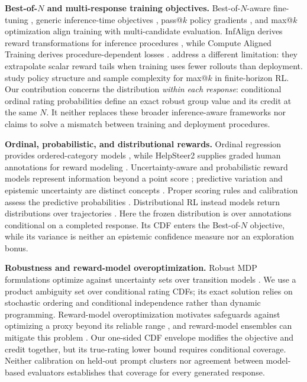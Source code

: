 \documentclass{article}
\theoremstyle{definition}
\theoremstyle{remark}
\begin{document}
\textbf{Best-of-\(N\) and multi-response training objectives.}
Best-of-\(N\)-aware fine-tuning \citep{chow2025inference}, generic
inference-time objectives \citep{tang2025inference}, pass@\(k\) policy
gradients \citep{walder2025pkpo}, and max@\(k\) optimization
\citep{bagirov2025best} align training with multi-candidate evaluation.
InfAlign derives reward transformations for inference procedures
\citep{balashankar2024infalign}, while Compute Aligned Training derives
procedure-dependent losses \citep{ousherovitch2026compute}.
\citet{li2026posttraining} address a different limitation: they extrapolate
scalar reward tails when training uses fewer rollouts than deployment.
\citet{poiani2026maxk} study policy structure and sample complexity for
max@\(k\) in finite-horizon RL. Our contribution concerns the distribution
\emph{within each response}: conditional ordinal rating probabilities define
an exact robust group value and its credit at the same \(N\). It neither
replaces these broader inference-aware frameworks nor claims to solve a
mismatch between training and deployment procedures.

\textbf{Ordinal, probabilistic, and distributional rewards.}
Ordinal regression provides ordered-category models
\citep{mccullagh1980regression}, while HelpSteer2 supplies graded human
annotations for reward modeling \citep{wang2024helpsteer2}. Uncertainty-aware
and probabilistic reward models represent information beyond a point score
\citep{lou2024uncertainty,sun2025purm}; predictive variation and epistemic
uncertainty are distinct concepts \citep{kendall2017uncertainties}.
Proper scoring rules and calibration assess the predictive probabilities
\citep{gneiting2007strictly,guo2017calibration}. Distributional RL instead
models return distributions over trajectories
\citep{bellemare2017distributional,dabney2018distributional}.
Here the frozen distribution is over annotations conditional on a completed
response. Its CDF enters the Best-of-\(N\) objective, while its variance
is neither an epistemic confidence measure nor an exploration bonus.

\textbf{Robustness and reward-model overoptimization.}
Robust MDP formulations optimize against uncertainty sets over transition
models \citep{iyengar2005robust,nilim2005robust}. We use a product ambiguity
set over conditional rating CDFs; its exact solution relies on stochastic
ordering and conditional independence rather than dynamic programming.
Reward-model overoptimization motivates safeguards against optimizing a proxy
beyond its reliable range \citep{gao2023scaling}, and reward-model ensembles
can mitigate this problem \citep{coste2024reward}. Our one-sided CDF envelope
modifies the objective and credit together, but its true-rating lower bound
requires conditional coverage. Neither calibration on held-out prompt
clusters nor agreement between model-based evaluators establishes that
coverage for every generated response.
\end{document}
